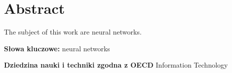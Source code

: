 \chapter{Abstract}

The subject of this work are neural networks.

\bigskip

\noindent\textbf{Słowa kluczowe:} neural networks

\bigskip

\noindent\textbf{Dziedzina nauki i techniki zgodna z OECD} Information Technology
